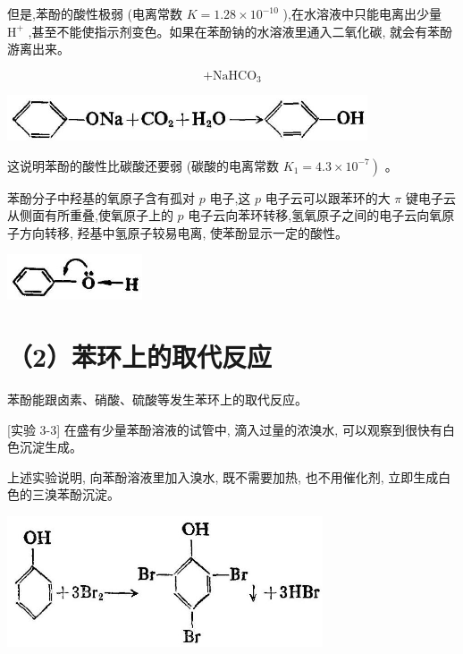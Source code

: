 \documentclass[10pt]{article}
\begin{document}
但是,苯酚的酸性极弱 (电离常数 \(K = {1.28} \times {10}^{-{10}}\) ),在水溶液中只能电离出少量 \({\mathrm{H}}^{ + }\) ,甚至不能使指示剂变色。如果在苯酚钠的水溶液里通入二氧化碳, 就会有苯酚游离出来。

\[
+ {\mathrm{{NaHCO}}}_{3}
\]

\begin{center}
\includegraphics[max width=0.8\textwidth]{images/01912d16-be99-77bb-9535-4f3ed8d9946f_123_377544.jpg}
\end{center}

这说明苯酚的酸性比碳酸还要弱 (碳酸的电离常数 \(\left. {{K}_{1} = {4.3} \times {10}^{-7}}\right)\) 。

苯酚分子中羟基的氧原子含有孤对 \(p\) 电子,这 \(p\) 电子云可以跟苯环的大 \(\pi\) 键电子云从侧面有所重叠,使氧原子上的 \(p\) 电子云向苯环转移,氢氧原子之间的电子云向氧原子方向转移, 羟基中氢原子较易电离, 使苯酚显示一定的酸性。

\begin{center}
\includegraphics[max width=0.3\textwidth]{images/01912d16-be99-77bb-9535-4f3ed8d9946f_123_131799.jpg}
\end{center}

\section*{（2）苯环上的取代反应}

苯酚能跟卤素、硝酸、硫酸等发生苯环上的取代反应。

[实验 3-3] 在盛有少量苯酚溶液的试管中, 滴入过量的浓溴水, 可以观察到很快有白色沉淀生成。

上述实验说明, 向苯酚溶液里加入溴水, 既不需要加热, 也不用催化剂, 立即生成白色的三溴苯酚沉淀。

\begin{center}
\includegraphics[max width=0.7\textwidth]{images/01912d16-be99-77bb-9535-4f3ed8d9946f_124_776310.jpg}
\end{center}
\end{document}
